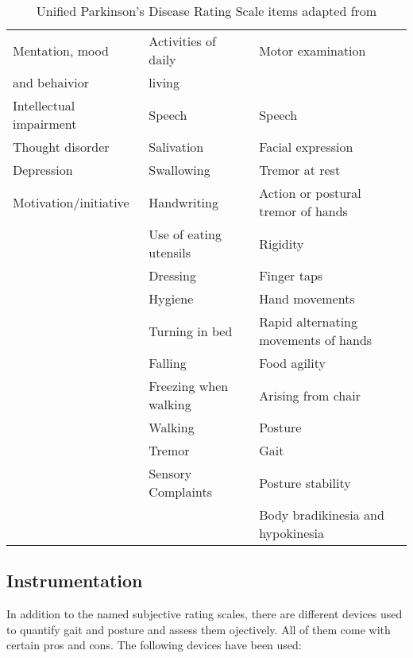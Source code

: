 \begin{table}[h]
\begin{tabular}{lll}
\hline
Mentation, mood & Activities of daily & Motor examination \\
and behaivior & living & \\
\hline
Intellectual impairment & Speech & Speech \\

Thought disorder & Salivation & Facial expression\\

Depression & Swallowing & Tremor at rest \\

Motivation/initiative & Handwriting & Action or postural tremor of hands \\

& Use of eating utensils & Rigidity \\

& Dressing & Finger taps\\

& Hygiene & Hand movements\\

& Turning in bed & Rapid alternating movements of hands\\

& Falling & Food agility\\

& Freezing when walking & Arising from chair \\

& Walking & Posture\\

& Tremor & Gait\\

& Sensory Complaints & Posture stability\\

& & Body bradikinesia and hypokinesia \\
\hline
\end{tabular}
\label{tab:UPDRS}
\caption{Unified Parkinson's Disease Rating Scale items adapted from \cite{herndon_handbook_2006}}
\end{table}

\subsection{Instrumentation}

In addition to the named subjective rating scales, there are different devices used to quantify gait and posture and assess them ojectively. All of them come with certain pros and cons. The following devices have been used:

